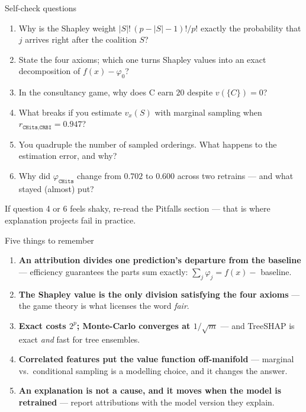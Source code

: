 \documentclass[aspectratio=169,11pt]{beamer}
\begin{document}
\begin{frame}{Self-check questions}
  \footnotesize
  \begin{readme}
    \begin{enumerate}
      \item Why is the Shapley weight $|S|!\,(p-|S|-1)!/p!$ exactly the probability
            that $j$ arrives right after the coalition $S$?
      \item State the four axioms; which one turns Shapley values into an exact
            decomposition of $f(x)-\varphi_0$?
      \item In the consultancy game, why does C earn $20$ despite
            $v(\{C\})=0$?
      \item What breaks if you estimate $v_x(S)$ with marginal sampling when
            $r_{\texttt{CHits},\texttt{CRBI}}=0.947$?
      \item You quadruple the number of sampled orderings. What happens to the
            estimation error, and why?
      \item Why did $\varphi_{\texttt{CHits}}$ change from $0.702$ to $0.600$
            across two retrains --- and what stayed (almost) put?
    \end{enumerate}
  \end{readme}
  \begin{takeaway}
    If question 4 or 6 feels shaky, re-read the Pitfalls section --- that is where
    explanation projects fail in practice.
  \end{takeaway}
\end{frame}

\begin{frame}{Five things to remember}
  \begin{takeaway}
    \begin{enumerate}
      \item \textbf{An attribution divides one prediction's departure from the baseline} ---
            efficiency guarantees the parts sum exactly: $\sum_j \varphi_j = f(x) - $ baseline.
      \item \textbf{The Shapley value is the only division satisfying the four axioms} ---
            the game theory is what licenses the word \emph{fair}.
      \item \textbf{Exact costs $2^p$; Monte-Carlo converges at $1/\sqrt{m}$} --- and
            TreeSHAP is exact \emph{and} fast for tree ensembles.
      \item \textbf{Correlated features put the value function off-manifold} --- marginal
            vs.\ conditional sampling is a modelling choice, and it changes the answer.
      \item \textbf{An explanation is not a cause, and it moves when the model is
            retrained} --- report attributions with the model version they explain.
    \end{enumerate}
  \end{takeaway}
\end{frame}
\end{document}
